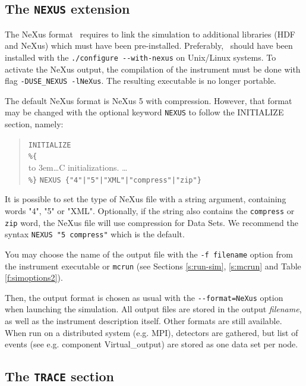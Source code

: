 \subsection{The \texttt{NEXUS} extension}
   
\label{s:nexus}

The NeXus format~\cite{nexus_webpage} requires to link the simulation to additional libraries (HDF and NeXus) which must have been pre-installed. Preferably, \MCS\ should have been installed with the \verb+./configure --with-nexus+ on Unix/Linux systems. To activate the NeXus output, the compilation of the instrument must be done with flag \verb+-DUSE_NEXUS -lNeXus+. The resulting executable is no longer portable.

The default NeXus format is NeXus 5 with compression. However, that format may be changed with the optional keyword \verb+NEXUS+ to follow the INITIALIZE section, namely:

\begin{quote}
  \texttt{INITIALIZE} \\
  \verb|%{| \\
  \hbox to 3em{}\ldots C initializations. \ldots \\
  \verb|%}|
  \verb+NEXUS {"4"|"5"|"XML"|"compress"|"zip"}+
\end{quote}

It is possible to set the type of NeXus file with a string argument, containing words "4", "5" or "XML". Optionally, if the string also contains the \verb+compress+ or \verb+zip+ word, the NeXus file will use compression for Data Sets. We recommend the syntax \verb+NEXUS "5 compress"+ which is the default.

You may choose the name of the output file with the \verb+-f filename+ option from the instrument executable or \verb+mcrun+ (see Sections \ref{s:run-sim}, \ref{s:mcrun} and Table \ref{f:simoptions2}).

Then, the output format is chosen as usual with the \verb+--format=NeXus+ option when launching the simulation. All output files are stored in the output {\it filename}, as well as the instrument description itself. Other formats are still available. When run on a distributed system (e.g. MPI), detectors are gathered, but list of events (see e.g. component Virtual\_output) are stored as one data set per node.

\subsection{The \texttt{TRACE} section}
\label{s:trace}


